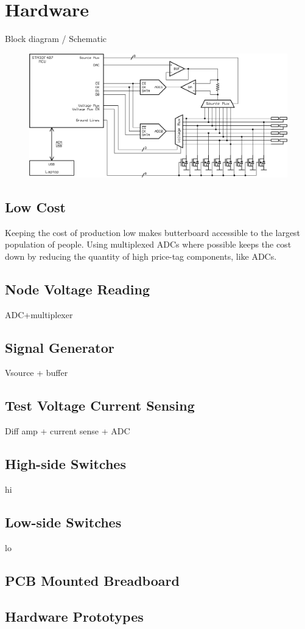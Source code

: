 %
\chapter{Hardware}
Block diagram / Schematic
\begin{figure}
  \begin{center}
      \includegraphics[width=1\textwidth]{../circuit.png}
  \end{center}
\end{figure}
\section{Low Cost}

Keeping the cost of production low makes butterboard accessible to the largest population of people.
Using multiplexed ADCs where possible keeps the cost down by reducing the quantity of high price-tag components, like ADCs.

\section{Node Voltage Reading}
ADC+multiplexer

\section{Signal Generator}
Vsource + buffer

\section{Test Voltage Current Sensing}
Diff amp + current sense + ADC

\section{High-side Switches}
hi
\section{Low-side Switches}
lo

\section{PCB Mounted Breadboard}

\section{Hardware Prototypes}
%
